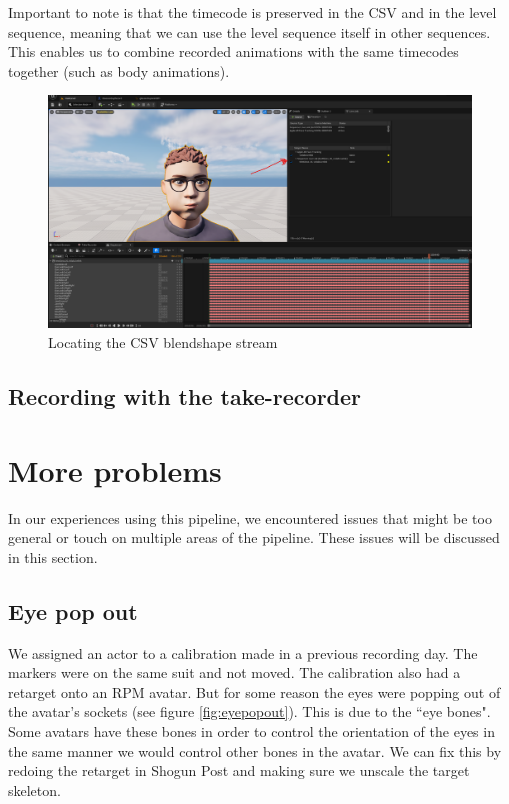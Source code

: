 \documentclass{uva-inf-article}
\begin{document}
Important to note is that the timecode is preserved in the CSV and in the level sequence, meaning that we can use the level sequence itself in other sequences. This enables us to combine recorded animations with the same timecodes together (such as body animations).
\begin{figure}[hbt!]
    \centering
    \includegraphics[width=\textwidth]{imgs/csvblendshapes.png}
    \caption{Locating the CSV blendshape stream}
    \label{fig:csvBlendshapes}
\end{figure}

\subsection{Recording with the take-recorder}

\section{More problems}
In our experiences using this pipeline, we encountered issues that might be too general or touch on multiple areas of the pipeline. These issues will be discussed in this section.

\subsection{Eye pop out}
We assigned an actor to a calibration made in a previous recording day. The markers were on the same suit and not moved. The calibration also had a retarget onto an RPM avatar. But for some reason the eyes were popping out of the avatar's sockets (see figure \ref{fig:eyepopout}). This is due to the ``eye bones". Some avatars have these bones in order to control the orientation of the eyes in the same manner we would control other bones in the avatar. We can fix this by redoing the retarget in Shogun Post and making sure we unscale the target skeleton.
\end{document}
